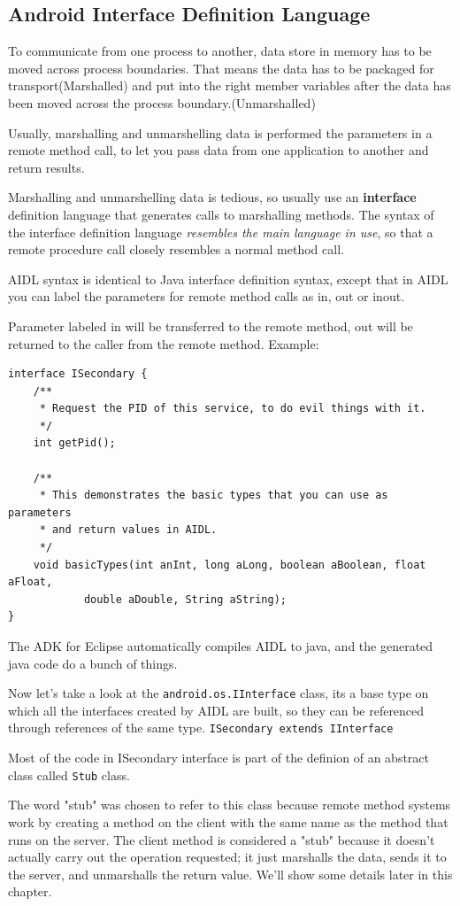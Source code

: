 \documentclass[11pt, a4paper]{book}
\begin{document}
\subsection{Android Interface Definition Language}
To communicate from one process to another, data store in memory has to be moved
across process boundaries. That means the data has to be packaged for
transport(Marshalled) and put into the right member variables after the data has
been moved across the process boundary.(Unmarshalled)

Usually, marshalling and unmarshelling data is performed the parameters in a
remote method call, to let you pass data from one application to another and
return results.

Marshalling and unmarshelling data is tedious, so usually use an
\textbf{interface} definition language that generates calls to marshalling
methods. The syntax of the interface definition language \emph{resembles the
main language in use}, so that a remote procedure call closely resembles a
normal method call. 

AIDL syntax is identical to Java interface definition syntax, except that in
AIDL you can label the parameters for remote method calls as in, out or inout. 

Parameter labeled in will be transferred to the remote method, out will be
returned to the caller from the remote method. Example:
\begin{verbatim}
interface ISecondary {
    /**
     * Request the PID of this service, to do evil things with it.
     */
    int getPid();

    /**
     * This demonstrates the basic types that you can use as parameters
     * and return values in AIDL.
     */
    void basicTypes(int anInt, long aLong, boolean aBoolean, float aFloat,
            double aDouble, String aString);
}
\end{verbatim}

The ADK for Eclipse automatically compiles AIDL to java, and the generated java
code do a bunch of things.

Now let's take a look at the \verb|android.os.IInterface| class, its a base type
on which all the interfaces created by AIDL are built, so they can be referenced
through references of the same type. \verb|ISecondary extends IInterface|

Most of the code in ISecondary interface is part of the definion of an abstract
class called \verb|Stub| class.

The word "stub" was chosen to refer to this class because remote method systems work by creating a method on the client with the same name as the method that runs on the server. The client method is considered a "stub" because it doesn't actually carry out the operation requested; it just marshalls the data, sends it to the server, and unmarshalls the return value. We'll show some details later in this chapter.
\end{document}
